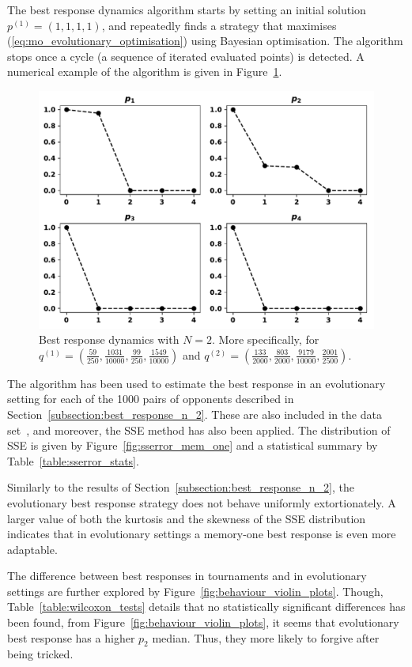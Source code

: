 The best response dynamics algorithm starts by setting an initial
solution \(p^{(1)}=(1, 1, 1, 1)\), and repeatedly finds a strategy that maximises
(\ref{eq:mo_evolutionary_optimisation}) using Bayesian optimisation. The
algorithm stops once a cycle (a sequence of iterated evaluated points) is
detected. A numerical example of the algorithm is given in Figure~\ref{fig:best_response_dynamics_results}.

\begin{figure}[!htbp]
    \centering
    \includegraphics[width=.6\textwidth]{src/chapters/chapters-05/paper/Memory-size-in-the-prisoners-dilemma/img/evolution_example_two.pdf}
    \caption{Best response dynamics with \(N=2\). More specifically, for
    \(q ^{(1)}=(\frac{59}{250},
                \frac{1031}{10000},
                \frac{99}{250},
                \frac{1549}{10000})\) and
    \(q ^{(2)}=(\frac{133}{2000},
                \frac{803}{2000},
                \frac{9179}{10000},
                \frac{2001}{2500})\).}
\label{fig:best_response_dynamics_results}
\end{figure}

The algorithm has been used to estimate the best response in an evolutionary
setting for each of the 1000 pairs of opponents described in
Section~\ref{subsection:best_response_n_2}. These are also included in the data
set~\cite{glynatsi2019}, and moreover, the SSE method has also been applied. The
distribution of SSE is given by Figure~\ref{fig:sserror_mem_one} and a
statistical summary by Table~\ref{table:sserror_stats}.

Similarly to the results of Section~\ref{subsection:best_response_n_2}, the
evolutionary best response strategy does not behave uniformly extortionately. A
larger value of both the kurtosis and the skewness of the SSE distribution
indicates that in evolutionary settings a memory-one best response is even more
adaptable.

The difference between best responses in tournaments and in evolutionary
settings are further explored by Figure~\ref{fig:behaviour_violin_plots}.
Though, Table~\ref{table:wilcoxon_tests} details that no statistically
significant differences has been found, from
Figure~\ref{fig:behaviour_violin_plots}, it seems that evolutionary best
response has a higher $p_2$ median. Thus, they more likely to forgive after
being tricked.

